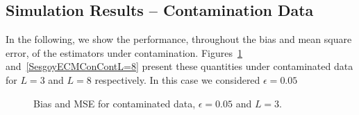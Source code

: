 \documentclass[twocolumn]{svjour3}
\begin{document}

\subsection{Simulation Results -- Contamination Data}
\label{CasesCont}

In the following, we show the performance, throughout the bias and mean square error, of the estimators under contamination. 
Figures~\ref{SesgoyECMConContL=3} and~\ref{SesgoyECMConContL=8} present these quantities under contaminated data for $L=3$ and $L=8$ respectively. In this case we considered $\epsilon=0.05$

\begin{figure}[hbt]
\centering
{}
\caption{Bias and MSE for contaminated data,  $\epsilon=0.05$ and $ L=3$.}\label{SesgoyECMConContL=3} 
\end{figure}
\end{document}
